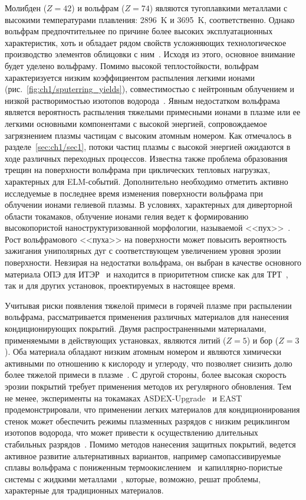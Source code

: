 Молибден ($Z=42$) и вольфрам ($Z=74$) являются тугоплавкими металлами с высокими температурами плавления: \SI{2896}{\kelvin} и \SI{3695}{\kelvin}, соответственно. Однако вольфрам предпочтительнее по причине более высоких эксплуатационных характеристик, хоть и обладает рядом свойств усложняющих технологическое производство элементов облицовки с ним~\cite{Piskarev2024}. Исходя из этого, основное внимание будет уделено вольфраму. Помимо высокой теплостойкости, вольфрам характеризуется низким коэффициентом распыления легкими ионами (рис.~\cref{fig:ch1/sputerring_yields}), совместимостью с нейтронным облучением и низкой растворимостью изотопов водорода~\cite{Pintsuk2012,Rieth2019}. Явным недостатком вольфрама является вероятность распыления тяжелыми примесными ионами в плазме или ее легкими основными компонентами с высокой энергией, сопровождаемое загрязнением плазмы частицам с высоким атомным номером. Как отмечалось в разделе~\cref{sec:ch1/sec1}, потоки частиц плазмы с высокой энергией ожидаются в ходе различных переходных процессов. Известна также проблема образования трещин на поверхности вольфрама при циклических тепловых нагрузках, характерных для ELM-событий. Дополнительно необходимо отметить активно исследуемые в последнее время изменения поверхности вольфрама при облучении ионами гелиевой плазмы. В условиях, характерных для диверторной области токамаков, облучение ионами гелия ведет к формированию высокопористой наноструктуризованной морфологии, называемой <<пух>>~\cite{Ueda2018,Kajita2018,Fedorovich2019,hammond2017helium,Kajita2020,Wright2022}. Рост вольфрамового <<пуха>> на поверхности может повысить вероятность зажигания униполярных дуг с соответствующем увеличением уровня эрозии поверхности. Невзирая на недостатки вольфрама, он выбран в качестве основного материала ОПЭ для ИТЭР~\cite{Pitts2025} и находится в приоритетном списке как для ТРТ~\cite{Piskarev2024}, так и для других установок, проектируемых в настоящее время.


Учитывая риски появления тяжелой примеси в горячей плазме при распылении вольфрама, рассматривается применения различных материалов для нанесения кондиционирующих покрытий. Двумя распространенными материалами, применяемыми в действующих установках, являются литий ($Z=5$) и бор ($Z=3$). Оба материала обладают низким атомным номером и являются химически активными по отношению к кислороду и углероду, что позволяет снизить долю более тяжелой примеси в плазме~\cite{Winter1996,Wauters2020}. С другой стороны, более высокая скорость эрозии покрытий требует применения методов их регулярного обновления. Тем не менее, эксперименты на токамаках ASDEX-Upgrade~\cite{Krieger2023} и EAST~\cite{Yu2023} продемонстрировали, что применении легких материалов для кондиционирования стенок может обеспечить режимы плазменных разрядов с низким рециклингом изотопов водорода, что может привести к осуществлению длительных стабильных разрядов~\cite{Zakharov2019}. Помимо методов нанесения защитных покрытий, ведется активное развитие альтернативных вариантов, например самопассивируемые сплавы вольфрама с пониженным термоокислением~\cite{Litnovsky2020} и капиллярно-пористые системы с жидкими металлами~\cite{Lublinskii2015}, которые, возможно, решат проблемы, характерные для традиционных материалов.


